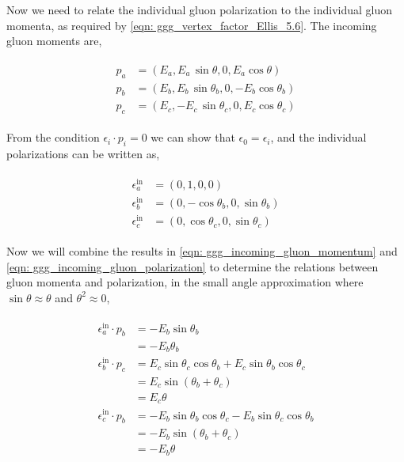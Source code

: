 \documentclass[main.tex]{subfiles}
\begin{document}
Now we need to relate the individual gluon polarization to the individual gluon momenta, as required by \autoref{eqn: ggg_vertex_factor_Ellis_5.6}. The incoming gluon moments are,

\begin{align}\label{eqn: ggg_incoming_gluon_momentum}
    \begin{split}
    p_a &= \left( E_a, E_a \, \sin \theta, 0, E_a \cos \theta \right)  \\
    p_b &= \left( E_b, E_b \, \sin \theta_b, 0, -E_b \cos \theta_b \right) \\
    p_c &= \left( E_c, -E_c \, \sin \theta_c, 0, E_c \cos \theta_c \right) 
    \end{split}
\end{align}

From the condition \(\epsilon_i \cdot p_i =0\) we can show that \(\epsilon_0 = \epsilon_i\), 
and the individual polarizations can be written as, 

\begin{align}\label{eqn: ggg_incoming_gluon_polarization}
    \begin{split}
    \epsilon^{\text{in}}_a &= \left( 0, 1, 0, 0\right)  \\
    \epsilon^{\text{in}}_b &= \left( 0, - \cos \theta_b, 0, \sin \theta_b \right) \\
    \epsilon^{\text{in}}_c &= \left( 0, \cos \theta_c, 0, \sin \theta_c \right) 
    \end{split}
\end{align}

Now we will combine the results in \autoref{eqn: ggg_incoming_gluon_momentum} and \autoref{eqn: ggg_incoming_gluon_polarization} to determine the relations between gluon momenta and polarization, in the small angle approximation where \(\sin \theta \approx \theta\) and \(\theta^2 \approx 0\), 

\begin{align}
    \begin{split}
    \epsilon^{\text{in}}_a \cdot p_b &= -E_b \sin \theta_b\\
        &= -E_b \theta_b \\
    \epsilon^{\text{in}}_b \cdot p_c &= E_c \sin \theta_c \cos \theta_b + E_c \sin \theta_b \cos \theta_c \\
    &= E_c \sin (\theta_b+\theta_c)  \\
    &= E_c \theta \\
    \epsilon^{\text{in}}_c \cdot p_b &= -E_b \sin \theta_b \cos \theta_c - E_b \sin \theta_c \cos \theta_b \\
    &= -E_b \sin(\theta_b+\theta_c) \\
    &= -E_b \theta
    \end{split}
\end{align}
\end{document}
